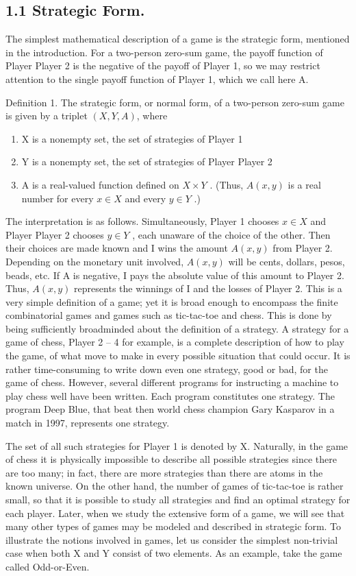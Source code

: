 \documentclass[]{report}
\begin{document}
\subsection{1.1 Strategic Form.} The simplest mathematical description of a game is the strategic
form, mentioned in the introduction. For a two-person zero-sum game, the payoff
function of Player Player 2 is the negative of the payoff of Player 1, so we may restrict attention
to the single payoff function of Player 1, which we call here A.
\begin{framed}
Definition 1. The strategic form, or normal form, of a two-person zero-sum game is given
by a triplet $(X, Y, A)$, where
\begin{enumerate}
\item X is a nonempty set, the set of strategies of Player 1
\item Y is a nonempty set, the set of strategies of Player Player 2
\item A is a real-valued function defined on $X \times Y$ . (Thus, $A(x, y)$ is a real number for
every $x \in X$ and every $y \in Y$ .)
\end{enumerate}
\end{framed}
The interpretation is as follows. Simultaneously, Player 1 chooses $x \in X$ and Player
Player 2 chooses $y \in Y$ , each unaware of the choice of the other. Then their choices are made
known and I wins the amount $A(x, y)$ from Player 2. Depending on the monetary unit involved,
$A(x, y)$ will be cents, dollars, pesos, beads, etc. If A is negative, I pays the absolute value
of this amount to Player 2. Thus, $A(x, y)$ represents the winnings of I and the losses of Player 2.
This is a very simple definition of a game; yet it is broad enough to encompass the
finite combinatorial games and games such as tic-tac-toe and chess. This is done by being
sufficiently broadminded about the definition of a strategy. A strategy for a game of chess,
Player 2 – 4
for example, is a complete description of how to play the game, of what move to make in
every possible situation that could occur. It is rather time-consuming to write down even
one strategy, good or bad, for the game of chess. However, several different programs for
instructing a machine to play chess well have been written. Each program constitutes one
strategy. The program Deep Blue, that beat then world chess champion Gary Kasparov
in a match in 1997, represents one strategy. 

The set of all such strategies for Player 1 is
denoted by X. Naturally, in the game of chess it is physically impossible to describe all
possible strategies since there are too many; in fact, there are more strategies than there
are atoms in the known universe. On the other hand, the number of games of tic-tac-toe
is rather small, so that it is possible to study all strategies and find an optimal strategy
for each player. Later, when we study the extensive form of a game, we will see that many
other types of games may be modeled and described in strategic form.
To illustrate the notions involved in games, let us consider the simplest non-trivial
case when both X and Y consist of two elements. As an example, take the game called
Odd-or-Even.
\end{document}
